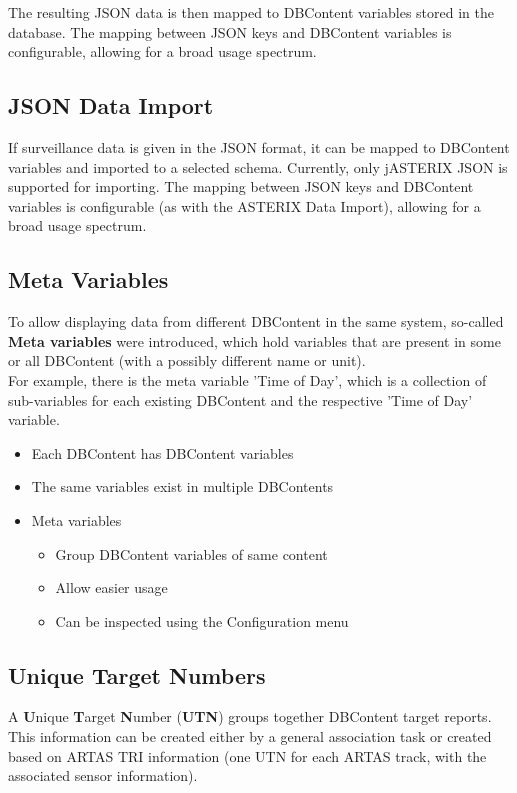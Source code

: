 The resulting JSON data is then mapped to DBContent variables stored in the database. The mapping between JSON keys and DBContent variables is configurable, allowing for a broad usage spectrum.

\subsection*{JSON Data Import}
If surveillance data is given in the JSON format, it can be mapped to DBContent variables and imported to a selected schema. Currently, only jASTERIX JSON is supported for importing. The mapping between JSON keys and DBContent variables is configurable (as with the ASTERIX Data Import), allowing for a broad usage spectrum.

\subsection*{Meta Variables}

To allow displaying data from different DBContent in the same system, so-called \textbf{Meta variables} were introduced, which hold variables that are present in some or all DBContent (with a possibly different name or unit). \\
For example, there is the meta variable 'Time of Day', which is a collection of sub-variables for each existing DBContent and the respective 'Time of Day' variable. \\

\begin{itemize}
\item Each DBContent has DBContent variables
\item The same variables exist in multiple DBContents
\item Meta variables
\begin{itemize}
\item Group DBContent variables of same content
\item Allow easier usage
\item Can be inspected using the Configuration menu
\end{itemize}
\end{itemize}

\subsection*{Unique Target Numbers}
A \textbf{U}nique \textbf{T}arget \textbf{N}umber (\textbf{UTN}) groups together DBContent target reports.
This information can be created either by a general association task or created based on ARTAS TRI information (one UTN for each ARTAS track, with the associated sensor information). \\

